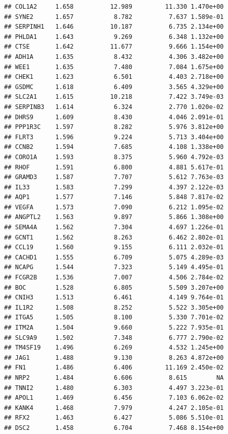 \documentclass{article}\usepackage[]{graphicx}\usepackage[]{color}
\makeatletter
\newenvironment{kframe}{%
 \def\at@end@of@kframe{}%
 \ifinner\ifhmode%
  \def\at@end@of@kframe{\end{minipage}}%
  \begin{minipage}{\columnwidth}%
 \fi\fi%
 \def\FrameCommand##1{\hskip\@totalleftmargin \hskip-\fboxsep
 \colorbox{shadecolor}{##1}\hskip-\fboxsep
     \hskip-\linewidth \hskip-\@totalleftmargin \hskip\columnwidth}%
 \MakeFramed {\advance\hsize-\width
   \@totalleftmargin\z@ \linewidth\hsize
   \@setminipage}}%
 {\par\unskip\endMakeFramed%
 \at@end@of@kframe}
\newenvironment{knitrout}{}{} %
\makeatother
\begin{document}
\begin{knitrout}
\begin{kframe}
\begin{verbatim}
## COL1A2     1.658          12.989         11.330 1.470e+00
## SYNE2      1.657           8.782          7.637 1.589e-01
## SERPINH1   1.646          10.187          6.735 2.134e+00
## PHLDA1     1.643           9.269          6.348 1.132e+00
## CTSE       1.642          11.677          9.666 1.154e+00
## ADH1A      1.635           8.432          4.306 3.482e+00
## WEE1       1.635           7.480          7.084 1.675e+00
## CHEK1      1.623           6.501          4.403 2.718e+00
## GSDMC      1.618           6.409          3.565 4.329e+00
## SLC2A1     1.615          10.218          7.422 3.749e-03
## SERPINB3   1.614           6.324          2.770 1.020e-02
## DHRS9      1.609           8.430          4.046 2.091e-01
## PPP1R3C    1.597           8.282          5.976 3.812e+00
## FLRT3      1.596           9.224          5.713 3.404e+00
## CCNB2      1.594           7.685          4.108 1.338e+00
## CORO1A     1.593           8.375          5.960 4.792e-03
## RHOF       1.591           6.800          4.881 5.617e-01
## GRAMD3     1.587           7.707          5.612 7.763e-03
## IL33       1.583           7.299          4.397 2.122e-03
## AQP1       1.577           7.146          5.848 7.817e-02
## VEGFA      1.573           7.090          6.212 1.095e-02
## ANGPTL2    1.563           9.897          5.866 1.308e+00
## SEMA4A     1.562           7.304          4.697 1.226e-01
## GCNT1      1.562           8.263          6.462 2.802e-01
## CCL19      1.560           9.155          6.111 2.032e-01
## CACHD1     1.555           6.709          5.075 4.289e-03
## NCAPG      1.544           7.323          5.149 4.495e-01
## FCGR2B     1.536           7.007          4.506 2.784e-02
## BOC        1.528           6.805          5.509 3.207e+00
## CNIH3      1.513           6.461          4.149 9.764e-01
## IL1R2      1.508           8.252          5.522 3.305e+00
## ITGA5      1.505           8.100          5.330 7.701e-02
## ITM2A      1.504           9.660          5.222 7.935e-01
## SLC9A9     1.502           7.348          6.777 2.790e-02
## TM4SF19    1.496           6.269          4.532 1.245e+00
## JAG1       1.488           9.130          8.263 4.872e+00
## FN1        1.486           6.406         11.169 2.450e-02
## NRP2       1.484           6.606          8.615        NA
## TNNI2      1.480           6.303          4.497 3.223e-01
## APOL1      1.469           6.456          7.103 6.062e-02
## KANK4      1.468           7.979          4.247 2.105e-01
## RFX2       1.463           6.427          5.086 5.510e-01
## DSC2       1.458           6.704          7.468 8.154e+00

\end{verbatim}
\end{kframe}
\end{knitrout}
\end{document}
